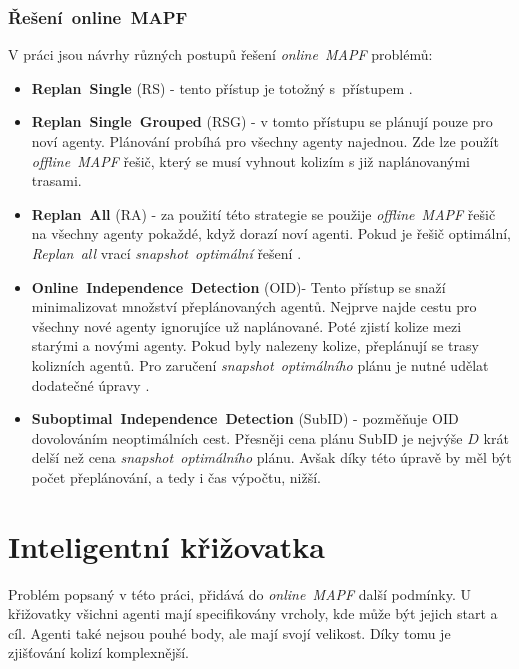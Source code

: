 \subsubsection{Řešení~online~MAPF}\label{subsubsec:reseni-online-mapf}

V práci \citet{Svancara} jsou návrhy různých postupů řešení \emph{online~MAPF} problémů:
\begin{itemize}
	\item \textbf{Replan~Single} (RS) - tento přístup je totožný s~přístupem .
	\item \textbf{Replan~Single~Grouped}\label{par:replan-single-grouped} (RSG) - v tomto přístupu se plánují pouze pro noví agenty.
	Plánování probíhá pro všechny agenty najednou.
	Zde lze použít \emph{offline~MAPF} řešič, který se musí vyhnout kolizím s již naplánovanými trasami.
	\item \textbf{Replan~All} (RA) - za použití této strategie se použije \emph{offline~MAPF} řešič na všechny agenty pokaždé, když dorazí noví agenti.
	Pokud je řešič optimální, \emph{Replan~all} vrací \emph{snapshot~optimální} řešení \citep{Svancara}.
	\item \textbf{Online~Independence~Detection} (OID)- Tento přístup se snaží minimalizovat množství přeplánovaných agentů.
	Nejprve najde cestu pro všechny nové agenty ignorujíce už naplánované.
	Poté zjistí kolize mezi starými a novými agenty.
	Pokud byly nalezeny kolize, přeplánují se trasy kolizních agentů.
	Pro zaručení \emph{snapshot~optimálního} plánu je nutné udělat dodatečné úpravy \citep{Svancara}.
	\item \textbf{Suboptimal~Independence~Detection} (SubID) - pozměňuje OID dovolováním neoptimálních cest.
	Přesněji cena plánu SubID je nejvýše $D$ krát delší než cena \emph{snapshot~optimálního} plánu.
	Avšak díky této úpravě by měl být počet přeplánování, a tedy i  čas výpočtu, nižší.
\end{itemize}

\section{Inteligentní křižovatka}\label{sec:inteligentni-krizovatka}
Problém popsaný v této práci, přidává do \emph{online~MAPF} další podmínky.
U křižovatky všichni agenti mají specifikovány vrcholy, kde může být jejich start a cíl.
Agenti také nejsou pouhé body, ale mají svojí velikost.
Díky tomu je zjišťování kolizí komplexnější.

